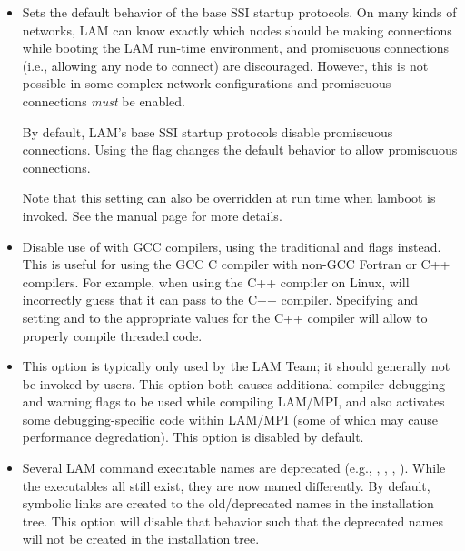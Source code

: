 \begin{itemize}
\item {}
  
  Sets the default behavior of the base  SSI startup
  protocols.  On many kinds of networks, LAM can know exactly which
  nodes should be making connections while booting the LAM run-time
  environment, and promiscuous connections (i.e., allowing any node to
  connect) are discouraged.  However, this is not possible in some
  complex network configurations and promiscuous connections {\em
    must} be enabled.
  
  By default, LAM's base  SSI startup protocols disable
  promiscuous connections.  Using the 
  flag changes the default behavior to allow promiscuous connections.
  
  Note that this setting can also be overridden at run time when
  lamboot is invoked.  See the  manual page
  for more details.


\item {}
  
  Disable use of  with GCC compilers, using the
  traditional  and  flags
  instead.  This is useful for using the GCC C compiler with non-GCC
  Fortran or C++ compilers.  For example, when using the  C++
  compiler on Linux,  will incorrectly guess that it
  can pass  to the C++ compiler.  Specifying
   and setting  and
   to the appropriate values for the C++ compiler
  will allow  to properly compile threaded code.


\item {}
  
  This option is typically only used by the LAM Team; it should
  generally not be invoked by users.  This option both causes
  additional compiler debugging and warning flags to be used while
  compiling LAM/MPI, and also activates some debugging-specific code
  within LAM/MPI (some of which may cause performance degredation).
  This option is disabled by default.


\item {}

  Several LAM command executable names are deprecated (e.g.,
  , , , ).
  While the executables all still exist, they are now named
  differently.  By default, symbolic links are created to the
  old/deprecated names in the installation tree.  This option will
  disable that behavior such that the deprecated names will not be
  created in the installation tree.


\end{itemize}
